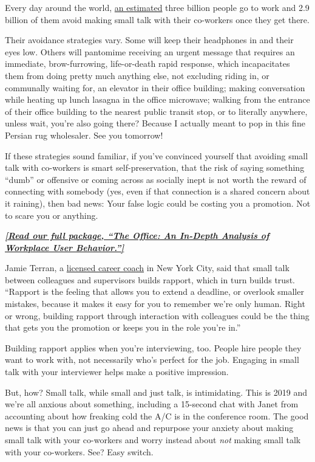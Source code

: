 Every day around the world,
\href{http://datatopics.worldbank.org/jobs/}{an estimated} three billion
people go to work and 2.9 billion of them avoid making small talk with
their co-workers once they get there.

Their avoidance strategies vary. Some will keep their headphones in and
their eyes low. Others will pantomime receiving an urgent message that
requires an immediate, brow-furrowing, life-or-death rapid response,
which incapacitates them from doing pretty much anything else, not
excluding riding in, or communally waiting for, an elevator in their
office building; making conversation while heating up lunch lasagna in
the office microwave; walking from the entrance of their office building
to the nearest public transit stop, or to literally anywhere, unless
wait, you're also going there? Because I actually meant to pop in this
fine Persian rug wholesaler. See you tomorrow!

If these strategies sound familiar, if you've convinced yourself that
avoiding small talk with co-workers is smart self-preservation, that the
risk of saying something ``dumb'' or offensive or coming across as
socially inept is not worth the reward of connecting with somebody (yes,
even if that connection is a shared concern about it raining), then bad
news: Your false logic could be costing you a promotion. Not to scare
you or anything.

\textbf{\href{https://www.nytimes3xbfgragh.onion/interactive/2019/09/17/style/the-office.html}{\emph{{[}Read
our full package, ``The Office: An In-Depth Analysis of Workplace User
Behavior.''{]}}}}

Jamie Terran, a \href{http://jamieterran.com/}{licensed career coach} in
New York City, said that small talk between colleagues and supervisors
builds rapport, which in turn builds trust. ``Rapport is the feeling
that allows you to extend a deadline, or overlook smaller mistakes,
because it makes it easy for you to remember we're only human. Right or
wrong, building rapport through interaction with colleagues could be the
thing that gets you the promotion or keeps you in the role you're in.''

Building rapport applies when you're interviewing, too. People hire
people they want to work with, not necessarily who's perfect for the
job. Engaging in small talk with your interviewer helps make a positive
impression.

But, how? Small talk, while small and just talk, is intimidating. This
is 2019 and we're all anxious about something, including a 15-second
chat with Janet from accounting about how freaking cold the A/C is in
the conference room. The good news is that you can just go ahead and
repurpose your anxiety about making small talk with your co-workers and
worry instead about \emph{not} making small talk with your co-workers.
See? Easy switch.

